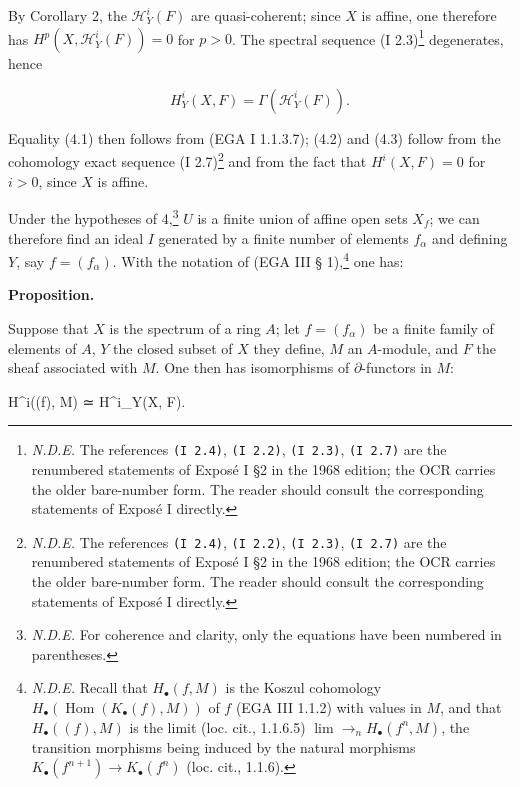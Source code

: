 \documentclass[
]{article}
\newenvironment{Shaded}{}{}
\newcommand{\NormalTok}[1]{#1}
\begin{document}
By Corollary 2, the \(\mathcal{H}^{i}_{Y}(F)\) are quasi-coherent; since
\(X\) is affine, one therefore has
\(H^{p}(X, \mathcal{H}^{i}_{Y}(F)) = 0\) for \(p > 0\). The spectral
sequence (I 2.3)\footnote{\emph{N.D.E.} The references
  \texttt{(I\ 2.4)}, \texttt{(I\ 2.2)}, \texttt{(I\ 2.3)},
  \texttt{(I\ 2.7)} are the renumbered statements of Exposé I §2 in the
  1968 edition; the OCR carries the older bare-number form. The reader
  should consult the corresponding statements of Exposé I directly.}
degenerates, hence

\[
H^{i}_{Y}(X, F) = \Gamma(\mathcal{H}^{i}_{Y}(F)).
\]

Equality (4.1) then follows from (EGA I 1.1.3.7); (4.2) and (4.3) follow
from the cohomology exact sequence (I 2.7)\footnote{\emph{N.D.E.} The
  references \texttt{(I\ 2.4)}, \texttt{(I\ 2.2)}, \texttt{(I\ 2.3)},
  \texttt{(I\ 2.7)} are the renumbered statements of Exposé I §2 in the
  1968 edition; the OCR carries the older bare-number form. The reader
  should consult the corresponding statements of Exposé I directly.} and
from the fact that \(H^{i}(X, F) = 0\) for \(i > 0\), since \(X\) is
affine.

Under the hypotheses of 4,\footnote{\emph{N.D.E.} For coherence and
  clarity, only the equations have been numbered in parentheses.} \(U\)
is a finite union of affine open sets \(X_{f}\); we can therefore find
an ideal \(I\) generated by a finite number of elements \(f_{\alpha}\)
and defining \(Y\), say \(f = (f_{\alpha})\). With the notation of (EGA
III § 1),\footnote{\emph{N.D.E.} Recall that \(H_{\bullet}(f, M)\) is
  the Koszul cohomology
  \(H_{\bullet}(\operatorname{Hom}(K_{\bullet}(f), M))\) of \(f\) (EGA
  III 1.1.2) with values in \(M\), and that \(H_{\bullet}((f), M)\) is
  the limit (loc. cit., 1.1.6.5) \(\lim\to_{n} H_{\bullet}(f^{n}, M)\),
  the transition morphisms being induced by the natural morphisms
  \(K_{\bullet}(f^{n+1}) \to K_{\bullet}(f^{n})\) (loc. cit., 1.1.6).}
one has:

\textbf{Proposition.}

Suppose that \(X\) is the spectrum of a ring \(A\); let
\(f = (f_{\alpha})\) be a finite family of elements of \(A\), \(Y\) the
closed subset of \(X\) they define, \(M\) an \(A\)-module, and \(F\) the
sheaf associated with \(M\). One then has isomorphisms of
\(\partial\)-functors in \(M\):

\begin{Shaded}
\begin{Highlighting}[]
\NormalTok{H\^{}i((f), M) ≃ H\^{}i\_Y(X, F).}
\end{Highlighting}
\end{Shaded}
\end{document}
